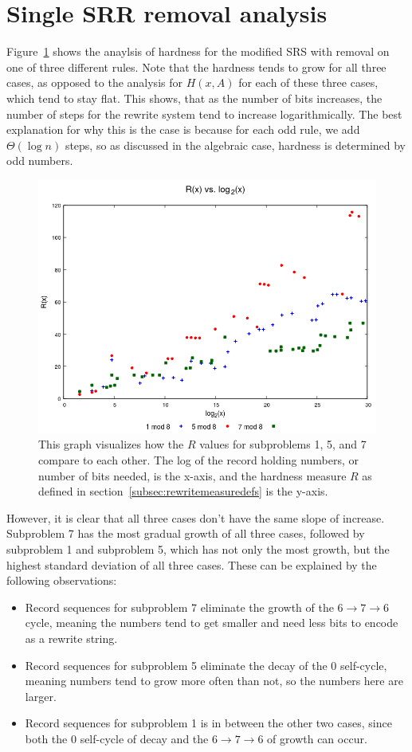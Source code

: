 \section{Single SRR removal analysis} \label{subsec:rewritehardness}
Figure~\ref{fig:rvslog} shows the anaylsis of hardness for the modified SRS with removal on one of three different rules. Note that the hardness tends to grow for all three cases, as opposed to the analysis for $H(x,A)$ for each of these three cases, which tend to stay flat. This shows, that as the number of bits increases, the number of steps for the rewrite system tend to increase logarithmically. The best explanation for why this is the case is because for each odd rule, we add $\Theta(\log{n})$ steps, so as discussed in the algebraic case, hardness is determined by odd numbers.
\begin{figure}
    \centering
    \includegraphics[scale=0.75]{ModAvoidanceAnalysisPics/R_vs_log.png}
    \caption{This graph visualizes how the $R$ values for subproblems 1, 5, and 7 compare to each other. The log of the record holding numbers, or number of bits needed, is the x-axis, and the hardness measure $R$ as defined in section~\ref{subsec:rewritemeasuredefs} is the y-axis.}
    \label{fig:rvslog}
\end{figure}
However, it is clear that all three cases don't have the same slope of increase. Subproblem 7 has the most gradual growth of all three cases, followed by subproblem 1 and subproblem 5, which has not only the most growth, but the highest standard deviation of all three cases. These can be explained by the following observations:
\begin{itemize}
    \item Record sequences for subproblem 7 eliminate the growth of the $6 \rightarrow 7 \rightarrow 6$ cycle, meaning the numbers tend to get smaller and need less bits to encode as a rewrite string.
    \item Record sequences for subproblem 5 eliminate the decay of the 0 self-cycle, meaning numbers tend to grow more often than not, so the numbers here are larger.
    \item Record sequences for subproblem 1 is in between the other two cases, since both the 0 self-cycle of decay and the $6 \rightarrow 7 \rightarrow 6$ of growth can occur.
\end{itemize}
